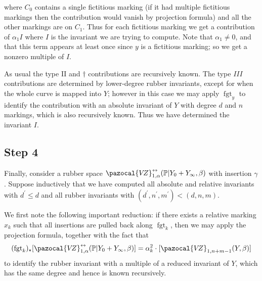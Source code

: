 \documentclass[11pt]{amsart}
\newcommand{\sqC}{\scalebox{0.8}[1.3]{$\sqsubset$}}
\newcommand{\VZ}{\pazocal{V\!Z}}
\newcommand{\st}{\star}
\newcommand{\fgt}{\operatorname{fgt}}
\theoremstyle{definition}
\theoremstyle{definition}
\begin{document}
\begin{center}
\end{center}
where $C_0$ contains a single fictitious marking (if it had multiple fictitious markings then the contribution would vanish by projection formula) and all the other markings are on $C_1$. Thus for each fictitious marking we get a contribution of $\alpha_1 I$ where $I$ is the invariant we are trying to compute. Note that $\alpha_1 \neq 0$, and that this term appears at least once since $y$ is a fictitious marking; so we get a nonzero multiple of $I$.

As usual the type II and $\dag$ contributions are recursively known. The type $III$ contributions are determined by lower-degree rubber invariants, except for when the whole curve is mapped into $Y$; however in this case we may apply $\fgt_y$ to identify the contribution with an absolute invariant of $Y$ with degree $d$ and $n$ markings, which is also recursively known. Thus we have determined the invariant $I$.

\subsection*{Step 4} Finally, consider a rubber space $\VZ^{\leftrightarrow}_{1,\alpha}(\mathbb P|Y_0+Y_\infty,\beta)$ with insertion $\gamma$. Suppose inductively that we have computed all absolute and relative invariants with $d^\prime \leq d$ and all rubber invariants with $(d^\prime,n^\prime,m^\prime) < (d,n,m)$.

We first note the following important reduction: if there exists a relative marking $x_k$ such that all insertions are pulled back along $\fgt_{k}$, then we may apply the projection formula, together with the fact that
\begin{equation*} (\fgt_{k})_\st [\VZ^{\leftrightarrow}_{1,\alpha}(\mathbb P|Y_0+Y_\infty,\beta)] = \alpha_k^2 \cdot [\VZ_{1,n+m-1}(Y,\beta)] \end{equation*}
to identify the rubber invariant with a multiple of a reduced invariant of $Y$, which has the same degree and hence is known recursively.
\end{document}
